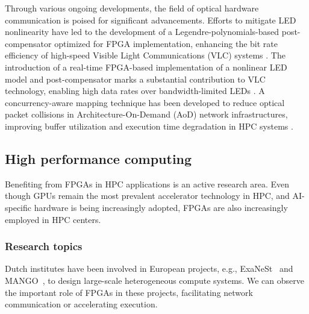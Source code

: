 Through various ongoing developments, the field of optical hardware communication is poised for significant advancements. Efforts to mitigate LED nonlinearity have led to the development of a Legendre-polynomials-based post-compensator optimized for FPGA implementation, enhancing the bit rate efficiency of high-speed Visible Light Communications (VLC) systems \cite{Niu2021LEDCommunications}. The introduction of a real-time FPGA-based implementation of a nonlinear LED model and post-compensator marks a substantial contribution to VLC technology, enabling high data rates over bandwidth-limited LEDs \cite{Deng2022Physics-BasedImplementation}. 
A concurrency-aware mapping technique has been developed to reduce optical packet collisions in Architecture-On-Demand  (AoD) network infrastructures, improving buffer utilization and execution time degradation in HPC systems \cite{Meyer2018OpticalPerformance}.



\subsection{High performance computing}\label{sec:high-performance-computing}

Benefiting from FPGAs in %
HPC applications is an active research area. %
Even though GPUs remain %
the most prevalent %
accelerator technology in HPC, and AI-specific hardware is being  increasingly adopted, %
FPGAs are also %
increasingly employed in HPC centers. 

\subsubsection*{\bf{Research topics}}
Dutch institutes have been involved in European projects, e.g., %
ExaNeSt~\cite{Katevenis2018NextDevelopment} and MANGO~\cite{Flich2018ExploringApproach}, to %
design %
large-scale heterogeneous compute systems. We can observe 
the important role of FPGAs in these projects, facilitating network communication or accelerating execution. %

